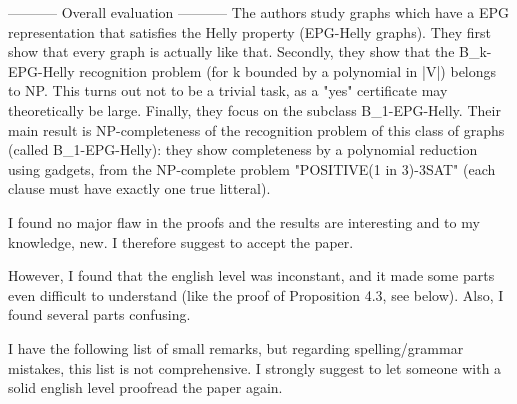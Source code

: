 ----------- Overall evaluation -----------
The authors study graphs which have a EPG representation that satisfies the Helly property (EPG-Helly graphs). They first show that every graph is actually like that. Secondly, they show that the B_k-EPG-Helly recognition problem (for k bounded by a polynomial in |V|) belongs to NP. This turns out not to be a trivial task, as a "yes" certificate may theoretically be large. Finally, they focus on the subclass B_1-EPG-Helly. Their main result is NP-completeness of the recognition problem of this class of graphs (called B_1-EPG-Helly): they show completeness by a polynomial reduction using gadgets, from the NP-complete problem "POSITIVE(1 in 3)-3SAT" (each clause must have exactly one true litteral).

I found no major flaw in the proofs and the results are interesting and to my knowledge, new. I therefore suggest to accept the paper.

However, I found that the english level was inconstant, and it made some parts even difficult to understand (like the proof of Proposition 4.3, see below). Also, I found several parts confusing.

I have the following list of small remarks, but regarding spelling/grammar mistakes, this list is not comprehensive. I strongly suggest to let someone with a solid english level proofread the paper again.

